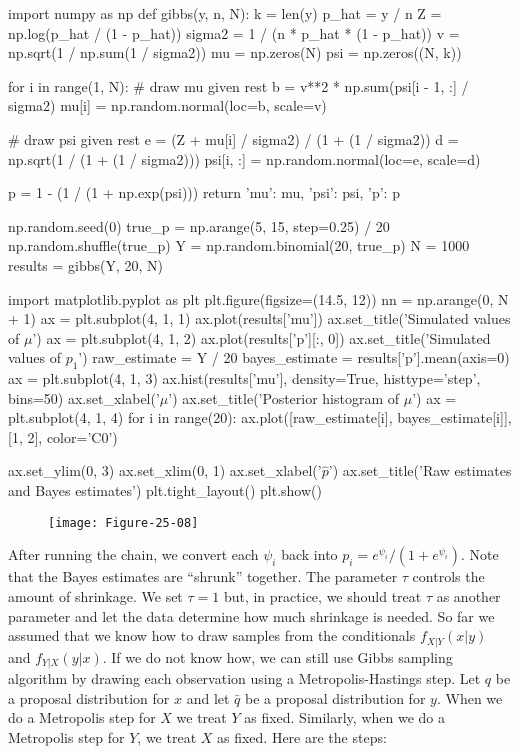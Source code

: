 \begin{python}
import numpy as np
def gibbs(y, n, N):
    k = len(y)
    p_hat = y / n
    Z = np.log(p_hat / (1 - p_hat))
    sigma2 = 1 / (n * p_hat * (1 - p_hat))
    v = np.sqrt(1 / np.sum(1 / sigma2))
    mu = np.zeros(N)
    psi = np.zeros((N, k))
    
    for i in range(1, N):
        # draw mu given rest
        b = v**2 * np.sum(psi[i - 1, :] / sigma2)
        mu[i] = np.random.normal(loc=b, scale=v)
        
        # draw psi given rest
        e = (Z + mu[i] / sigma2) / (1 + (1 / sigma2))
        d = np.sqrt(1 / (1 + (1 / sigma2)))
        psi[i, :] = np.random.normal(loc=e, scale=d)
        
    p = 1 - (1 / (1 + np.exp(psi)))
    return {
        'mu': mu,
        'psi': psi,
        'p': p
    }
\end{python}

\begin{python}
np.random.seed(0)
true_p = np.arange(5, 15, step=0.25) / 20
np.random.shuffle(true_p)
Y = np.random.binomial(20, true_p)
N = 1000
results = gibbs(Y, 20, N)
\end{python}

\begin{python}
import matplotlib.pyplot as plt
plt.figure(figsize=(14.5, 12))
nn = np.arange(0, N + 1)
ax = plt.subplot(4, 1, 1)
ax.plot(results['mu'])
ax.set_title('Simulated values of $\mu$')
ax = plt.subplot(4, 1, 2)
ax.plot(results['p'][:, 0])
ax.set_title('Simulated values of $p_{1}$')
raw_estimate = Y / 20
bayes_estimate = results['p'].mean(axis=0)
ax = plt.subplot(4, 1, 3)
ax.hist(results['mu'], density=True, histtype='step', bins=50)
ax.set_xlabel('$\mu$')
ax.set_title('Posterior histogram of $\mu$')
ax = plt.subplot(4, 1, 4)
for i in range(20):
    ax.plot([raw_estimate[i], bayes_estimate[i]], [1, 2], color='C0')
    
ax.set_ylim(0, 3)
ax.set_xlim(0, 1)
ax.set_xlabel('$\hat{p}$')
ax.set_title('Raw estimates and Bayes estimates')
plt.tight_layout()
plt.show()
\end{python}

\begin{figure}[H]
\centering
\texttt{[image: Figure-25-08]}
\end{figure}

After running the chain, we convert each \(\psi_{i}\) back into
\(p_{i} = e^{\psi_{i}} / (1 + e^{\psi_{i}})\). Note that the Bayes estimates
are ``shrunk'' together. The parameter \(\tau\) controls the amount of
shrinkage. We set \(\tau = 1\) but, in practice, we should treat
\(\tau\) as another parameter and let the data determine how much
shrinkage is needed.
So far we assumed that we know how to draw samples from the conditionals
\(f_{X | Y}(x | y)\) and \(f_{Y | X}(y | x)\). If we do not know how, we
can still use Gibbs sampling algorithm by drawing each observation using
a Metropolis-Hastings step. Let \(q\) be a proposal distribution for
\(x\) and let \(\bar{q}\) be a proposal distribution for \(y\).
When we do a Metropolis step for \(X\) we treat \(Y\) as fixed.
Similarly, when we do a Metropolis step for \(Y\), we treat \(X\) as
fixed. Here are the steps:
